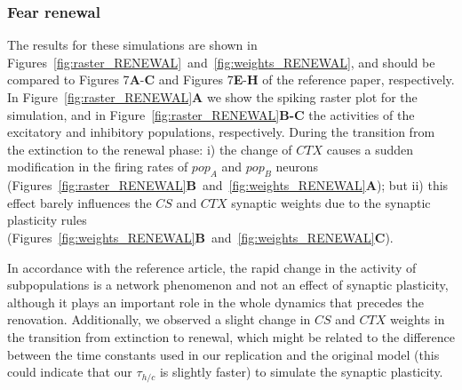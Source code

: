 \subsubsection*{Fear renewal}
The results for these simulations are shown in Figures~\ref{fig:raster_RENEWAL}~and~\ref{fig:weights_RENEWAL}, and should be compared to Figures 7\textbf{A}-\textbf{C} and Figures 7\textbf{E}-\textbf{H} of the reference paper, respectively. In Figure~\ref{fig:raster_RENEWAL}\textbf{A} we show the spiking raster plot for the simulation, and in Figure~\ref{fig:raster_RENEWAL}\textbf{B-C} the activities of the excitatory and inhibitory populations, respectively. During the transition from the extinction to the renewal phase: i) the change of $CTX$ causes a sudden modification in the firing rates of $pop_A$ and $pop_B$ neurons (Figures~\ref{fig:raster_RENEWAL}\textbf{B}~and~\ref{fig:weights_RENEWAL}\textbf{A}); but ii) this effect barely influences the $CS$ and $CTX$ synaptic weights due to the synaptic plasticity rules (Figures~\ref{fig:weights_RENEWAL}\textbf{B}~and~\ref{fig:weights_RENEWAL}\textbf{C}).

In accordance with the reference article, the rapid change in the activity of subpopulations is a network phenomenon and not an effect of synaptic plasticity, although it plays an important role in the whole dynamics that precedes the renovation. Additionally, we observed a slight change in $CS$ and $CTX$ weights in the transition from extinction to renewal, which might be related to the difference between the time constants used in our replication and the original model (this could indicate that our $\tau_{h/c}$ is slightly faster) to simulate the synaptic plasticity.


